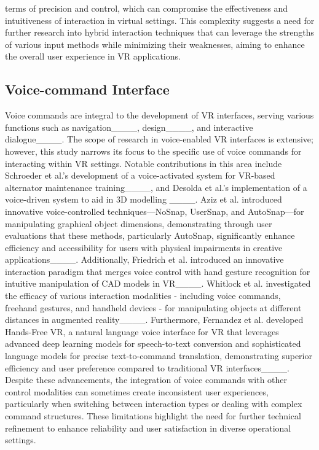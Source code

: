 terms of precision and control, which can compromise the effectiveness and intuitiveness of interaction in virtual settings. This complexity suggests a need for further research into hybrid interaction techniques that can leverage the strengths of various input methods while minimizing their weaknesses, aiming to enhance the overall user experience in VR applications.


\subsection{Voice-command Interface}
Voice commands are integral to the development of VR interfaces, serving various functions such as navigation____, design____, and interactive dialogue____. The scope of research in voice-enabled VR interfaces is extensive; however, this study narrows its focus to the specific use of voice commands for interacting within VR settings. Notable contributions in this area include Schroeder et al.'s development of a voice-activated system for VR-based alternator maintenance training____, and Desolda et al.'s implementation of a voice-driven system to aid in 3D modelling ____. Aziz et al. introduced innovative voice-controlled techniques—NoSnap, UserSnap, and AutoSnap—for manipulating graphical object dimensions, demonstrating through user evaluations that these methods, particularly AutoSnap, significantly enhance efficiency and accessibility for users with physical impairments in creative applications____. Additionally, Friedrich et al. introduced an innovative interaction paradigm that merges voice control with hand gesture recognition for intuitive manipulation of CAD models in VR____. Whitlock et al. investigated the efficacy of various interaction modalities - including voice commands, freehand gestures, and handheld devices - for manipulating objects at different distances in augmented reality____. Furthermore, Fernandez et al. developed Hands-Free VR, a natural language voice interface for VR that leverages advanced deep learning models for speech-to-text conversion and sophisticated language models for precise text-to-command translation, demonstrating superior efficiency and user preference compared to traditional VR interfaces____. Despite these advancements, the integration of voice commands with other control modalities can sometimes create inconsistent user experiences, particularly when switching between interaction types or dealing with complex command structures. These limitations highlight the need for further technical refinement to enhance reliability and user satisfaction in diverse operational settings. 

